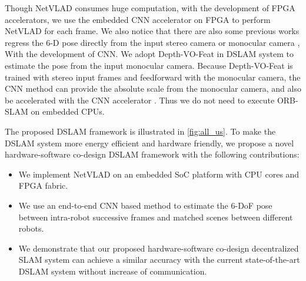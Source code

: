 Though NetVLAD consumes huge computation, with the development of FPGA accelerators, we use the embedded CNN accelerator on FPGA \cite{Tech:2019360} to perform NetVLAD for each frame.
We also notice that there are also some previous works regress the 6-D pose directly from the input stereo camera \cite{kendall2017end} or monocular camera \cite{Li:2018ca8, Zhan:2018e92}, With the development of CNN.
We adopt Depth-VO-Feat \cite{Zhan:2018e92} in DSLAM system to estimate the pose from the input monocular camera.
Because Depth-VO-Feat is trained with stereo input frames and feedforward with the monocular camera, the CNN method can provide the absolute scale from the monocular camera, and also be accelerated with the CNN accelerator \cite{Tech:2019360}. Thus we do not need to execute ORB-SLAM on embedded CPUs. 

The proposed DSLAM framework is illustrated in \cref{fig:all_us}. To make the DSLAM system more energy efficient and hardware friendly, we propose a novel hardware-software co-design DSLAM framework with the following contributions:
\begin{itemize}
\item We implement NetVLAD on an embedded SoC platform with CPU cores and FPGA fabric.
\item We use an end-to-end CNN based method to estimate the 6-DoF pose between intra-robot successive frames and matched scenes between different robots.
\item We demonstrate that our proposed hardware-software co-design decentralized SLAM system can achieve a similar accuracy with the current state-of-the-art DSLAM system without increase of communication.
\end{itemize}

